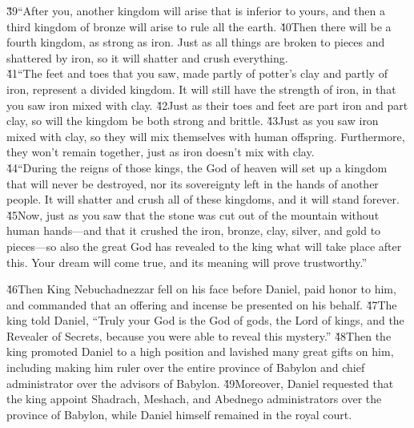 \begin{poetry}
\poeml \v{39}``After you, another kingdom will arise that is inferior to yours, and then a third kingdom of bronze will arise to rule all the earth. \v{40}Then there will be a fourth kingdom, as strong as iron. Just as all things are broken to pieces and shattered by iron, so it will shatter and crush everything. \\
\poeml \v{41}``The feet and toes that you saw, made partly of potter's clay and partly of iron, represent a divided kingdom. It will still have the strength of iron, in that you saw iron mixed with clay. \v{42}Just as their toes and feet are part iron and part clay, so will the kingdom be both strong and brittle. \v{43}Just as you saw iron mixed with clay, so they will mix themselves with human offspring. Furthermore, they won't remain together, just as iron doesn't mix with clay. \\
\poeml \v{44}``During the reigns of those kings, the God of heaven will set up a kingdom that will never be destroyed, nor its sovereignty left in the hands of another people. It will shatter and crush all of these kingdoms, and it will stand forever. \v{45}Now, just as you saw that the stone was cut out of the mountain without human hands---and that it crushed the iron, bronze, clay, silver, and gold to pieces---so also the great God has revealed to the king what will take place after this. Your dream will come true, and its meaning will prove trustworthy.''
\end{poetry}

\v{46}Then King Nebuchadnezzar fell on his face before Daniel, paid honor to him, and commanded that an offering and incense be presented on his behalf. \v{47}The king told Daniel, ``Truly your God is the God of gods, the Lord of kings, and the Revealer of Secrets, because you were able to reveal this mystery.'' \v{48}Then the king promoted Daniel to a high position and lavished many great gifts on him, including making him ruler over the entire province of Babylon and chief administrator over the advisors of Babylon. \v{49}Moreover, Daniel requested that the king appoint Shadrach, Meshach, and Abednego administrators over the province of Babylon, while Daniel himself remained in the royal court.


